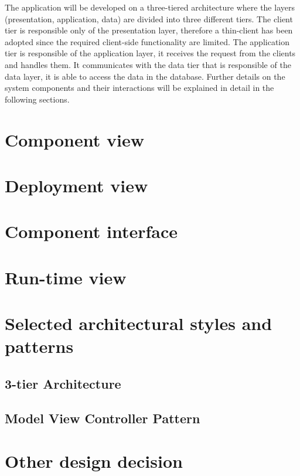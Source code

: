 The application will be developed on a three-tiered architecture where the layers (presentation, application, data) are divided into three different tiers. \newline
The client tier is responsible only of the presentation layer, therefore a thin-client has been adopted since the required client-side functionality are limited. The application tier is responsible of the application layer, it receives the request from the clients and handles them. It communicates with the data tier that is responsible of the data layer, it is able to access the data in the database. \newline
Further details on the system components and their interactions will be explained in detail in the following sections.

\section{Component view}
\section{Deployment view}
\section{Component interface}
\section{Run-time view}
\section{Selected architectural styles and patterns}
\subsection*{3-tier Architecture}
\subsection*{Model View Controller Pattern}
\section{Other design decision}